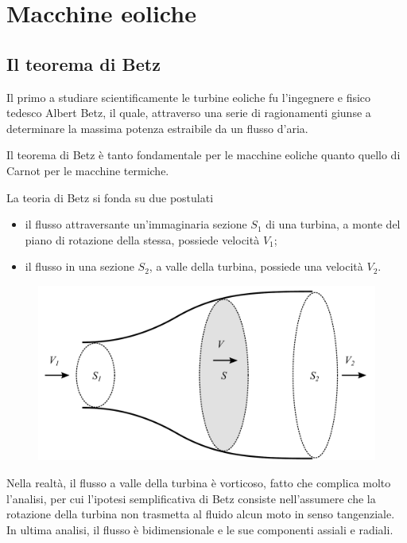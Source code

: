 \chapter{Macchine eoliche}
\section{Il teorema di Betz}
Il primo a studiare scientificamente le turbine eoliche fu l'ingegnere e fisico tedesco Albert Betz, il quale, attraverso una serie di ragionamenti giunse a determinare la massima potenza estraibile da un flusso d'aria.

Il teorema di Betz è tanto fondamentale per le macchine eoliche quanto quello di Carnot per le macchine termiche. 

La teoria di Betz si fonda su due postulati
\begin{itemize}
\item il flusso attraversante un'immaginaria sezione $S_1$ di una turbina, a monte del piano di rotazione della stessa, possiede velocità $V_1$;
\item il flusso in una sezione $S_2$, a valle della turbina, possiede una velocità $V_2$.
\end{itemize}
\begin{figure}
\centering
  \includegraphics[width=.6\textwidth]{fig/Betz.pdf}
\caption{}
\label{}
\end{figure}
Nella realtà, il flusso a valle della turbina è vorticoso, fatto che complica molto l'analisi, per cui l'ipotesi semplificativa di Betz consiste nell'assumere che la rotazione della turbina non trasmetta al fluido alcun moto in senso tangenziale. In ultima analisi, il flusso è bidimensionale e le sue componenti assiali e radiali. 

